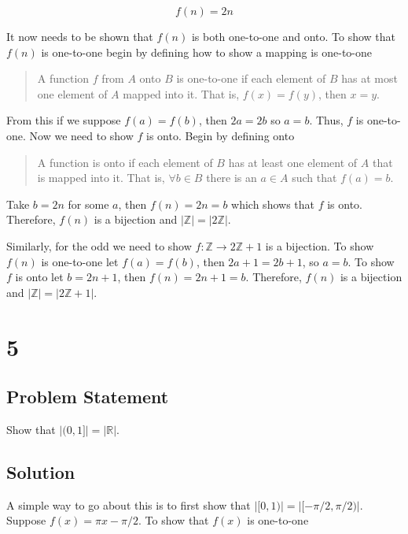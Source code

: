 \documentclass[11pt,a4paper,final]{article}
\begin{document}
\begin{equation*}
f(n) = 2n
\end{equation*}

It now needs to be shown that \(f(n)\) is both one-to-one and onto. To show that \(f(n)\) is one-to-one begin by defining
how to show a mapping is one-to-one

\begin{quote}
A function \(f\) from \(A\) onto \(B\) is one-to-one if each element of \(B\) has at most one element of \(A\) mapped into it.
That is, \(f(x) = f(y)\), then \(x = y\).
\end{quote}

From this if we suppose \(f(a) = f(b)\), then \(2a = 2b\) so \(a=b\). Thus, \(f\) is one-to-one. Now we need to show \(f\) is
onto. Begin by defining onto

\begin{quote}
A function is onto if each element of \(B\) has at least one element of \(A\) that is mapped into it. That is, \(\forall b
\in B\) there is an \(a \in A\) such that \(f(a) = b\).
\end{quote}

Take \(b = 2n\) for some \(a\), then \(f(n) = 2n = b\) which shows that \(f\) is onto. Therefore, \(f(n)\) is a bijection and
\(|\mathbb{Z}| = |2\mathbb{Z}|\).

Similarly, for the odd we need to show \(f : \mathbb{Z} \rightarrow 2\mathbb{Z}+1\) is a bijection. To show \(f(n)\) is one-to-one let \(f(a) = f(b)\),
then \(2a + 1 = 2b + 1\), so \(a=b\). To show \(f\) is onto let \(b = 2n+1\), then \(f(n) = 2n + 1 = b\). Therefore, \(f(n)\) is a
bijection and \(|\mathbb{Z}| = |2\mathbb{Z}+1|\).

\section{5}
\label{sec:org2b58a6e}

\subsection{Problem Statement}
\label{sec:org8b364b7}
Show that \(|(0,1]| = |\mathbb{R}|\).

\subsection{Solution}
\label{sec:org6115038}
A simple way to go about this is to first show that \(\big|[0,1)\big| = \big|[-\pi/2, \pi/2)\big|\). Suppose \(f(x) = \pi x - \pi/2\). To show that
\(f(x)\) is one-to-one
\end{document}
